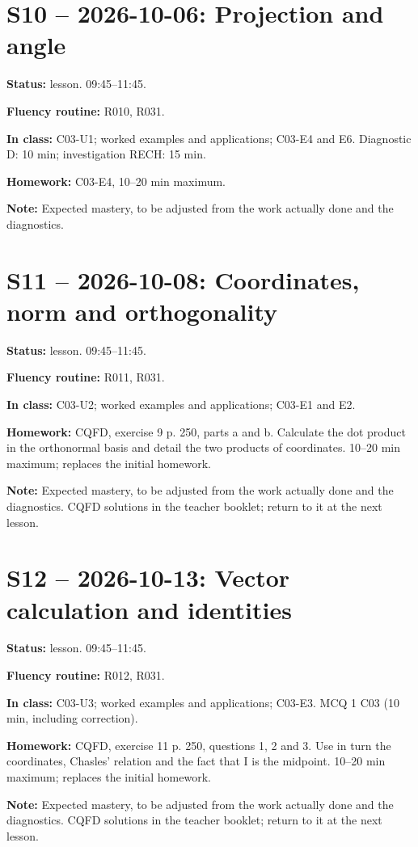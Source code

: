 \section*{S10 -- 2026-10-06: Projection and angle}
\textbf{Status:} lesson. 09:45–11:45.\par\textbf{Fluency routine:} R010, R031.\par\textbf{In class:} C03-U1; worked examples and applications; C03-E4 and E6. Diagnostic D: 10 min; investigation RECH: 15 min.\par\textbf{Homework:} C03-E4, 10–20 min maximum.\par\textbf{Note:} Expected mastery, to be adjusted from the work actually done and the diagnostics.
\section*{S11 -- 2026-10-08: Coordinates, norm and orthogonality}
\textbf{Status:} lesson. 09:45–11:45.\par\textbf{Fluency routine:} R011, R031.\par\textbf{In class:} C03-U2; worked examples and applications; C03-E1 and E2. \par\textbf{Homework:} CQFD, exercise 9 p. 250, parts a and b. Calculate the dot product in the orthonormal basis and detail the two products of coordinates. 10–20 min maximum; replaces the initial homework.\par\textbf{Note:} Expected mastery, to be adjusted from the work actually done and the diagnostics. CQFD solutions in the teacher booklet; return to it at the next lesson.
\section*{S12 -- 2026-10-13: Vector calculation and identities}
\textbf{Status:} lesson. 09:45–11:45.\par\textbf{Fluency routine:} R012, R031.\par\textbf{In class:} C03-U3; worked examples and applications; C03-E3.  MCQ 1 C03 (10 min, including correction).\par\textbf{Homework:} CQFD, exercise 11 p. 250, questions 1, 2 and 3. Use in turn the coordinates, Chasles' relation and the fact that I is the midpoint. 10–20 min maximum; replaces the initial homework.\par\textbf{Note:} Expected mastery, to be adjusted from the work actually done and the diagnostics. CQFD solutions in the teacher booklet; return to it at the next lesson.
